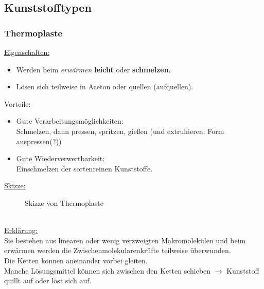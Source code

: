 \documentclass[../../main.tex]{subfiles}
\begin{document}
\subsection{Kunststofftypen}
\subsubsection{Thermoplaste}
\underline{Eigenschaften:}
\begin{itemize}
    \item Werden beim \textit{erwärmen} \textbf{leicht} oder \textbf{schmelzen}.
    \item Lösen sich teilweise in Aceton oder quellen (aufquellen).
\end{itemize}
Vorteile:
\begin{itemize}
    \item Gute Verarbeitungsmöglichkeiten:\\
        Schmelzen, dann pressen, spritzen, gießen (und extruhieren: Form auspressen(?))
    \item Gute Wiederverwertbarkeit: \\
        Einschmelzen der sortenreinen Kunststoffe.
\end{itemize}
\underline{Skizze:}
\begin{figure}[ht]
    \centering
    \caption{Skizze von Thermoplaste}
    \label{fig:skizze_thermoplaste}
\end{figure}
\\
\underline{Erklärung:} \\
Sie bestehen aus linearen oder wenig verzweigten Makromolekülen und beim
erwärmen werden die Zwischenmolekularenkrüfte teilweise überwunden. \\
Die Ketten können aneinander vorbei gleiten. \\
Manche Lösungsmittel können sich zwischen den Ketten schieben $\rightarrow$
Kunststoff quillt auf oder löst sich auf.
\end{document}
